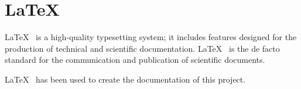 
\section[\LaTeX]{\LaTeX\cite{website:latex}}\label{sec:Latex}

\LaTeX~ is a high-quality typesetting system; it includes features designed for the production of technical and scientific documentation. \LaTeX~ is the de facto standard for the communication and publication of scientific documents.

\LaTeX~ has been used to create the documentation of this project.

